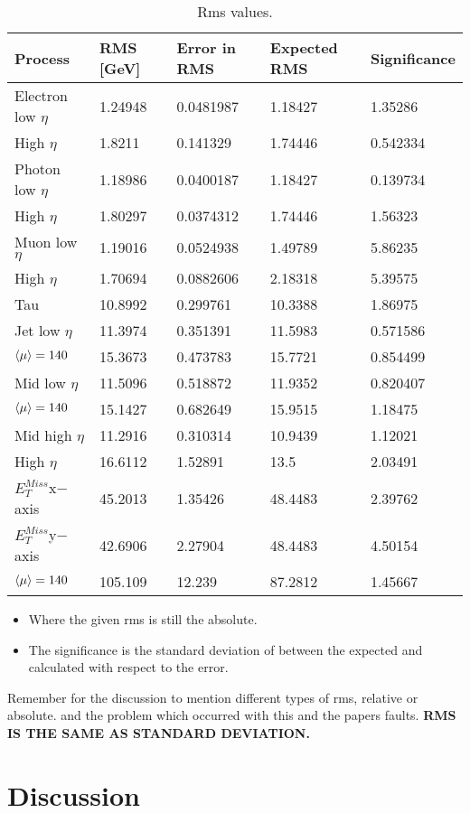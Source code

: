 \newpage
\begin{table}[H]
\begin{center}
\begin{tabular}{|l|l|l|l|l|}
\hline
Process&RMS [GeV]&Error in RMS&Expected RMS& Significance\\ \hline
Electron low $\eta$&1.24948&0.0481987&1.18427&1.35286\\
High $\eta$&1.8211&0.141329&1.74446&0.542334\\ \hline
Photon low $\eta$&1.18986&0.0400187&1.18427&0.139734\\
High $\eta$&1.80297&0.0374312&1.74446&1.56323\\ \hline
Muon low $\eta$&1.19016&0.0524938&1.49789&5.86235\\
High $\eta$&1.70694&0.0882606&2.18318&5.39575\\ \hline
Tau&10.8992&0.299761&10.3388&1.86975\\ \hline
Jet low $\eta$&11.3974&0.351391&11.5983&0.571586\\
$\left<\mu\right>=140$&15.3673&0.473783&15.7721&0.854499\\
Mid low $\eta$&11.5096&0.518872&11.9352&0.820407\\
$\left<\mu\right>=140$&15.1427&0.682649&15.9515&1.18475\\
Mid high $\eta$&11.2916&0.310314&10.9439&1.12021\\
High $\eta$&16.6112&1.52891&13.5&2.03491\\ \hline
$E_T^{Miss} $x$-$axis&45.2013&1.35426&48.4483&2.39762\\ \hline
$E_T^{Miss} $y$-$axis&42.6906&2.27904&48.4483&4.50154\\ 
$\left<\mu\right>=140$&105.109&12.239&87.2812&1.45667\\  \hline
\end{tabular}
\end{center}
\caption{Rms values.}
\label{tab:rmsval}
\end{table}
\begin{itemize}
\item Where the given rms is still the absolute. 
\item The significance is the standard deviation of between the expected and calculated with respect to the error.
\end{itemize}
Remember for the discussion to mention different types of rms, relative or absolute. and the problem which occurred with this and the papers faults. \textbf{RMS IS THE SAME AS STANDARD DEVIATION.}
\section{Discussion}
